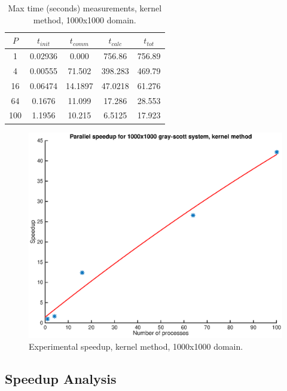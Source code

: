 \documentclass[a4paper,11pt]{article}
\begin{document}
\begin{table}[h]
\def\arraystretch{1.2}
\begin{center}
\caption{Max time (seconds) measurements, kernel method, 1000x1000 domain.}
\label{tab:matrix}
\begin{tabular}{| c | c | c | c | c |}
\hline
$P$ & $t_{init}$ & $t_{comm}$ & $t_{calc}$ & $t_{tot}$ \\
\hline
1 & 0.02936 &  0.000 & 756.86 & 756.89\\
\hline
4 & 0.00555 & 71.502 & 398.283 & 469.79\\
\hline
16 & 0.06474 & 14.1897 & 47.0218 & 61.276\\
\hline
64 & 0.1676 & 11.099 & 17.286 & 28.553\\
\hline
100 & 1.1956 & 10.215 & 6.5125 & 17.923\\
\hline
\end{tabular}
\end{center}
\end{table}

\begin{figure}
  \centering
  \includegraphics[scale=0.6]{kernel-1k}
    \caption{Experimental speedup, kernel method, 1000x1000 domain.}
    \label{fig:kernel-1k}
\end{figure}

\subsection*{Speedup Analysis}
\end{document}
